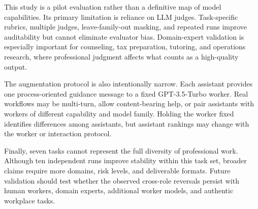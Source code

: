 This study is a pilot evaluation rather than a definitive map of model
capabilities. Its primary limitation is reliance on LLM judges. Task-specific
rubrics, multiple judges, leave-family-out masking, and repeated runs improve
auditability but cannot eliminate evaluator bias. Domain-expert validation is
especially important for counseling, tax preparation, tutoring, and
operations research, where professional judgment affects what counts as a
high-quality output.

The augmentation protocol is also intentionally narrow. Each assistant
provides one process-oriented guidance message to a fixed GPT-3.5-Turbo
worker. Real workflows may be multi-turn, allow content-bearing help, or pair
assistants with workers of different capability and model family. Holding the
worker fixed identifies differences among assistants, but assistant rankings
may change with the worker or interaction protocol.

Finally, seven tasks cannot represent the full diversity of professional work.
Although ten independent runs improve stability within this task set, broader
claims require more domains, risk levels, and deliverable formats. Future
validation should test whether the observed cross-role reversals persist with
human workers, domain experts, additional worker models, and authentic
workplace tasks.
